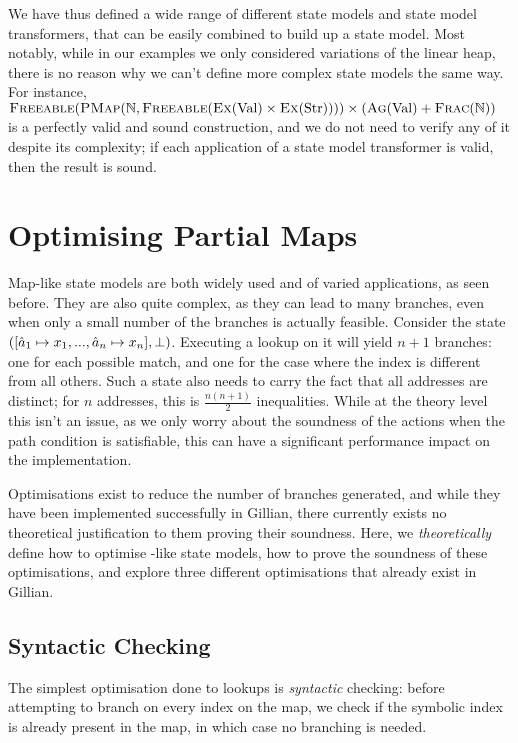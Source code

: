 We have thus defined a wide range of different state models and state model transformers, that can be easily combined to build up a state model. Most notably, while in our examples we only considered variations of the linear heap, there is no reason why we can't define more complex state models the same way. For instance, $\textsc{Freeable}(\textsc{PMap}(\mathbb N, \textsc{Freeable}(\textsc{Ex}(\text{Val}) \times \textsc{Ex}(\text{Str})))) \times (\textsc{Ag}(\text{Val}) + \textsc{Frac}(\mathbb N))$ is a perfectly valid and sound construction, and we do not need to verify any of it despite its complexity; if each application of a state model transformer is valid, then the result is sound.

\section{Optimising Partial Maps} \label{sec:theory-optim-pmap}

Map-like state models are both widely used and of varied applications, as seen before. They are also quite complex, as they can lead to many branches, even when only a small number of the branches is actually feasible. Consider the \PMap{} state $([ \hat{a}_1\mapsto x_1, ..., \hat{a}_n\mapsto x_n ], \bot)$. Executing a lookup on it will yield $n+1$ branches: one for each possible match, and one for the case where the index is different from all others. Such a state also needs to carry the fact that all addresses are distinct; for $n$ addresses, this is $\frac{n(n+1)}{2}$ inequalities. While at the theory level this isn't an issue, as we only worry about the soundness of the actions when the path condition is satisfiable, this can have a significant performance impact on the implementation.

Optimisations exist to reduce the number of branches generated, and while they have been implemented successfully in Gillian, there currently exists no theoretical justification to them proving their soundness. Here, we \emph{theoretically} define how to optimise \PMap-like state models, how to prove the soundness of these optimisations, and explore three different optimisations that already exist in Gillian.

\subsection{Syntactic Checking}

The simplest optimisation done to lookups is \emph{syntactic} checking: before attempting to branch on every index on the map, we check if the symbolic index is already present in the map, in which case no branching is needed.

